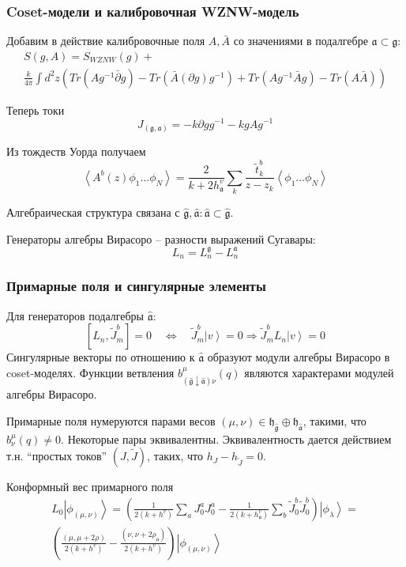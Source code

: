 \documentclass[pdftex]{beamer}
\newcommand{\gf}{\mathfrak{g}}
\newcommand{\gfh}{\hat{\mathfrak{g}}}
\newcommand{\af}{\mathfrak{a}}
\newcommand{\afh}{\hat{\mathfrak{a}}}
\newcommand{\hf}{\mathfrak{h}}
\theoremstyle{definition} \newtheorem{Def}{Определение}
\begin{document}
\begin{frame}
  \frametitle{Coset-модели и калибровочная WZNW-модель}

  Добавим в действие калибровочные поля $A, \bar{A}$ со значениями в подалгебре $\af\subset \gf$:
  \begin{multline*}
    S(g,A)=S_{WZNW}(g)+\\
    \frac{k}{4\pi}\int d^{2}z \left(Tr(A g^{-1}\bar \partial g)-Tr(\bar A (\partial g ) g^{-1})+Tr(A g^{-1}\bar A g)-Tr(A \bar A)\right)
  \end{multline*}

  Теперь токи
  \begin{equation*}
    J_{(\gf,\af)}=-k\partial g g^{-1} -k g A g^{-1}
  \end{equation*}

  Из тождеств Уорда получаем
  \begin{equation*}
    \left< A^{b}(z)\phi_{1}\dots \phi_{N}\right>=\frac{2}{k+2 h^{v}_{\af}}\sum_{k}\frac{\tilde{t}^{b}_{k}}{z-z_{k}}\left<\phi_{1}\dots \phi_{N}\right>
  \end{equation*}


  Алгебраическая структура связана с  $\gfh, \afh: \afh\subset\gfh$. 

  Генераторы алгебры Вирасоро -- разности выражений Сугавары:
  \begin{equation*}
    L_{n}=L_{n}^{\gf}-L_{n}^{\af}
  \end{equation*}
\end{frame}

\begin{frame}
  \frametitle{Примарные поля и сингулярные элементы}
  Для генераторов подалгебры $\afh$:
  \begin{equation*}
    \left[ L_{n}, \tilde{J}^{b}_{m}\right]=0 \quad\Longleftrightarrow\quad \tilde{J}^{b}_{m}\left| v \right>=0\Rightarrow \tilde{J}^{b}_{m}L_{n}\left| v \right>=0
  \end{equation*}
  Сингулярные векторы по отношению к $\afh$ образуют модули алгебры Вирасоро в coset-моделях. Функции ветвления $b^{\mu}_{(\gfh\downarrow\afh) \nu}(q)$ являются характерами модулей алгебры Вирасоро.

  Примарные поля нумеруются парами весов $(\mu,\nu)\in \hf_{\gfh}\oplus \hf_{\afh}$, такими, что  $b^{\mu}_{\nu}(q)\neq 0$. Некоторые пары эквивалентны. Эквивалентность дается действием т.н. ``простых токов'' $(J,\tilde{J})$, таких, что $h_{J}-h_{\tilde{J}}=0$. 

  Конформный вес примарного поля
  \begin{multline}
    L_0\left|\phi_{(\mu,\nu)}\right>=\left(\frac{1}{2(k+h^v)}\sum_aJ^a_0J^a_0-\frac{1}{2(k+h_{\af}^v)}\sum_b \tilde{J}^b_0 \tilde{J}^b_0 \right)
    \left|\phi_{\lambda}\right>=\\
    \left(\frac{(\mu,\mu+2\rho)}{2(k+h^v)}-\frac{(\nu,\nu+2\rho_{\af})}{2(k+h^v)}\right)\left|\phi_{(\mu,\nu)}\right>
  \end{multline}

\end{frame}
\end{document}
